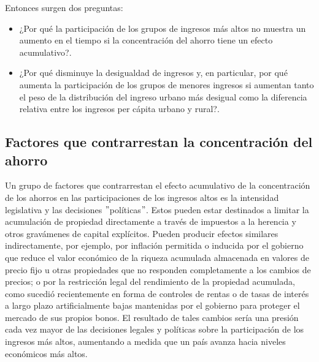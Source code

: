     Entonces surgen dos preguntas: 
    \begin{itemize}
	\item ¿Por qué la participación de los grupos de ingresos más altos no muestra un aumento en el tiempo si la concentración del ahorro tiene un efecto acumulativo?.
	\item ¿Por qué disminuye la desigualdad de ingresos y, en particular, por qué aumenta la participación de los grupos de menores ingresos si aumentan tanto el peso de la distribución del ingreso urbano más desigual como la diferencia relativa entre los ingresos per cápita urbano y rural?.
    \end{itemize}

\subsection*{Factores que contrarrestan la concentración del ahorro}
Un grupo de factores que contrarrestan el efecto acumulativo de la concentración de los ahorros en las participaciones de los ingresos altos es la intensidad legislativa y las decisiones $"$políticas$"$. Estos pueden estar destinados a limitar la acumulación de propiedad directamente a través de impuestos a la herencia y otros gravámenes de capital explícitos. 
Pueden producir efectos similares indirectamente, por ejemplo, por inflación permitida o inducida por el gobierno que reduce el valor económico de la riqueza acumulada almacenada en valores de precio fijo u otras propiedades que no responden completamente a los cambios de precios; o por la restricción legal del rendimiento de la propiedad acumulada, como sucedió recientemente en forma de controles de rentas o de tasas de interés a largo plazo artificialmente bajas mantenidas por el gobierno para proteger el mercado de sus propios bonos. 
El resultado de tales cambios sería una presión cada vez mayor de las decisiones legales y políticas sobre la participación de los ingresos más altos, aumentando a medida que un país avanza hacia niveles económicos más altos.\\

